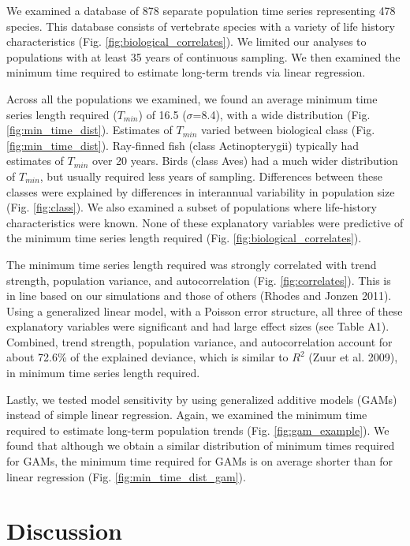 \documentclass[12pt,]{article}
\begin{document}
We examined a database of 878 separate population time series
representing 478 species. This database consists of vertebrate species
with a variety of life history characteristics (Fig.
\ref{fig:biological_correlates}). We limited our analyses to populations
with at least 35 years of continuous sampling. We then examined the
minimum time required to estimate long-term trends via linear
regression.

Across all the populations we examined, we found an average minimum time
series length required (\(T_{min}\)) of 16.5 (\(\sigma\)=8.4), with a
wide distribution (Fig. \ref{fig:min_time_dist}). Estimates of
\(T_{min}\) varied between biological class (Fig.
\ref{fig:min_time_dist}). Ray-finned fish (class Actinopterygii)
typically had estimates of \(T_{min}\) over 20 years. Birds (class Aves)
had a much wider distribution of \(T_{min}\), but usually required less
years of sampling. Differences between these classes were explained by
differences in interannual variability in population size (Fig.
\ref{fig:class}). We also examined a subset of populations where
life-history characteristics were known. None of these explanatory
variables were predictive of the minimum time series length required
(Fig. \ref{fig:biological_correlates}).

The minimum time series length required was strongly correlated with
trend strength, population variance, and autocorrelation (Fig.
\ref{fig:correlates}). This is in line based on our simulations and
those of others (Rhodes and Jonzen 2011). Using a generalized linear
model, with a Poisson error structure, all three of these explanatory
variables were significant and had large effect sizes (see Table A1).
Combined, trend strength, population variance, and autocorrelation
account for about 72.6\% of the explained deviance, which is similar to
\(R^2\) (Zuur et al. 2009), in minimum time series length required.

Lastly, we tested model sensitivity by using generalized additive models
(GAMs) instead of simple linear regression. Again, we examined the
minimum time required to estimate long-term population trends (Fig.
\ref{fig:gam_example}). We found that although we obtain a similar
distribution of minimum times required for GAMs, the minimum time
required for GAMs is on average shorter than for linear regression (Fig.
\ref{fig:min_time_dist_gam}).

\section{Discussion}\label{discussion}
\end{document}
